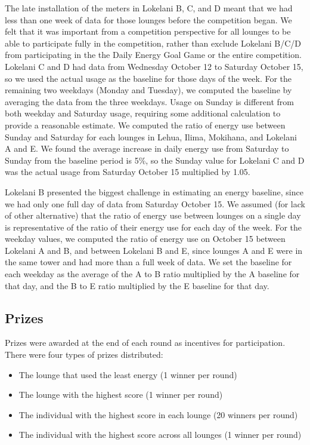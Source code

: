 The late installation of the meters in Lokelani B, C, and D meant that we had less than one week of data for those lounges before the competition began. We felt that it was important from a competition perspective for all lounges to be able to participate fully in the competition, rather than exclude Lokelani B/C/D from participating in the the Daily Energy Goal Game or the entire competition. Lokelani C and D had data from Wednesday October 12 to Saturday October 15, so we used the actual usage as the baseline for those days of the week. For the remaining two weekdays (Monday and Tuesday), we computed the baseline by averaging the data from the three weekdays. Usage on Sunday is different from both weekday and Saturday usage, requiring some additional calculation to provide a reasonable estimate. We computed the ratio of energy use between Sunday and Saturday for each lounges in Lehua, Ilima, Mokihana, and Lokelani A and E. We found the average increase in daily energy use from Saturday to Sunday from the baseline period is 5\%, so the Sunday value for Lokelani C and D was the actual usage from Saturday October 15 multiplied by 1.05.

Lokelani B presented the biggest challenge in estimating an energy baseline, since we had only one full day of data from Saturday October 15. We assumed (for lack of other alternative) that the ratio of energy use between lounges on a single day is representative of the ratio of their energy use for each day of the week. For the weekday values, we computed the ratio of energy use on October 15 between Lokelani A and B, and between Lokelani B and E, since lounges A and E were in the same tower and had more than a full week of data. We set the baseline for each weekday as the average of the A to B ratio multiplied by the A  baseline for that day, and the B to E ratio multiplied by the E baseline for that day.


\subsection{Prizes}
\label{sec:prizes}

Prizes were awarded at the end of each round as incentives for participation. There were four types of prizes distributed:

\begin{itemize}
	\item The lounge that used the least energy (1 winner per round)
	\item The lounge with the highest score (1 winner per round)
	\item The individual with the highest score in each lounge (20 winners per round)
	\item The individual with the highest score across all lounges (1 winner per round)
\end{itemize}

